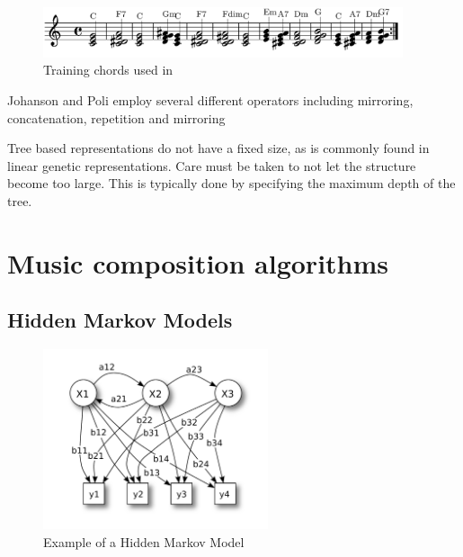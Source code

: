 \begin{figure}
\centerline{\includegraphics[width=400px]{../images/eck_chords_training.png}}
\caption{Training chords used in \cite{Eck2002}}
\label{ims:eckchords}
\end{figure}

Johanson and Poli employ several different operators including mirroring, concatenation, repetition and mirroring \cite{Johanson1998}

Tree based representations do not have a fixed size, as is commonly found in linear genetic representations. Care must be taken to not let the structure become too large. This is typically done by specifying the maximum depth of the tree.


\chapter{Music composition algorithms} \label{chap:comp_algo}

\section{Hidden Markov Models} \label{sec:hmm_backround}

\begin{figure}[ht!]
\center
\includegraphics[width=250px]{../images/HiddenMarkovModel.pdf}
\caption{Example of a Hidden Markov Model}
\label{ims:hmm_example}
\end{figure}

